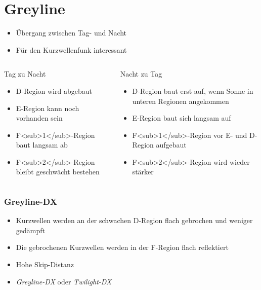 
\section{Greyline}
\label{section:greyline}
\begin{frame}%
\begin{itemize}
  \item Übergang zwischen Tag- und Nacht
  \item Für den Kurzwellenfunk interessant
  \end{itemize}
\end{frame}

\begin{frame}

\end{frame}

\begin{frame}
\begin{columns}
    \begin{column}{0.48\textwidth}
    Tag zu Nacht

\begin{itemize}
  \item D-Region wird abgebaut
  \item E-Region kann noch vorhanden sein
  \item F<sub>1</sub>-Region baut langsam ab
  \item F<sub>2</sub>-Region bleibt geschwächt bestehen
  \end{itemize}

    \end{column}
   \begin{column}{0.48\textwidth}
       Nacht zu Tag

\begin{itemize}
  \item D-Region baut erst auf, wenn Sonne in unteren Regionen angekommen
  \item E-Region baut sich langsam auf
  \item F<sub>1</sub>-Region vor E- und D-Region aufgebaut
  \item F<sub>2</sub>-Region wird wieder stärker
  \end{itemize}

   \end{column}
\end{columns}

\end{frame}

\begin{frame}
\frametitle{Greyline-DX}
\begin{itemize}
  \item Kurzwellen werden an der schwachen D-Region flach gebrochen und weniger gedämpft
  \item Die gebrochenen Kurzwellen werden in der F-Region flach reflektiert
  \item Hohe Skip-Distanz
  \item \emph{Greyline-DX} oder \emph{Twilight-DX}
  \end{itemize}
\end{frame}

